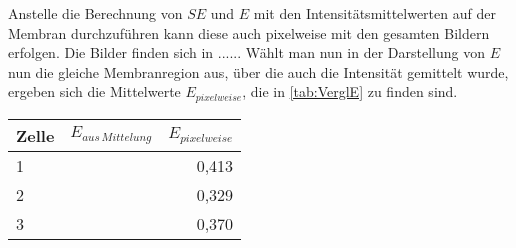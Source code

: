 Anstelle die Berechnung von $SE$ und $E$ mit den Intensitätsmittelwerten auf der Membran durchzuführen kann diese auch pixelweise 
mit den gesamten Bildern erfolgen. Die Bilder finden sich in ...... Wählt man nun in der Darstellung von $E$ nun die gleiche 
Membranregion aus, über die auch die Intensität gemittelt wurde, ergeben sich die Mittelwerte $E_{pixelweise}$, die in \ref{tab:VerglE} 
zu finden sind.

\begin{center}
    \centering
    \begin{tabular}{l|r|r}
        Zelle & $E_{aus \, Mittelung}$ & $E_{pixelweise}$\\
        \hline
        1 & & 0,413\\
        2 & & 0,329\\
        3 & & 0,370\\
    \end{tabular}
    \label{tab:VerglE}
\end{center}